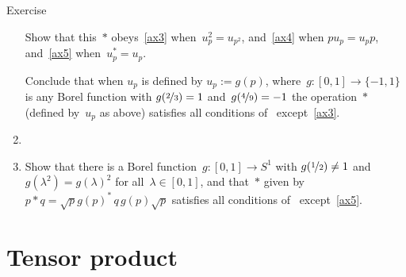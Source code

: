\documentclass[a]{subfiles}
\begin{document}
\begin{parsec}
\begin{point}{Exercise}
\begin{enumerate}
Show that this~$\ast$ obeys~\ref{ax3} when~$u_p^2=u_{p^2}$,
and~\ref{ax4} when $pu_p=u_p p$,
and~\ref{ax5} when~$u_p^*=u_p$.

Conclude that when $u_p$ is defined by $u_p:=g(p)$,
where~$g\colon [0,1]\to\{-1,1\}$
is any Borel function with $g(\nicefrac{2}{3})=1$
and~$g(\nicefrac{4}{9})=-1$
the operation~$\ast$ (defined by~$u_p$ as above) satisfies
all conditions of~ except~\ref{ax3}.
\item
{}
\item
Show that there is a Borel
function~$g\colon[0,1]\to S^1$
with $g(\nicefrac{1}{2})\neq 1$
and~$g(\lambda^2)=g(\lambda)^2$ for all~$\lambda\in [0,1]$,
and that~$\ast$ given by~$p\ast q = \sqrt{p} g(p)^* \,q \,g(p)\sqrt{p}$
satisfies all conditions of~
except~\ref{ax5}.




\end{enumerate}
\end{point}
\end{parsec}


\section{Tensor product}
\end{document}
